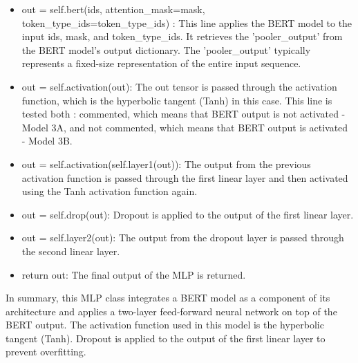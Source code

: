 \begin{itemize}
    \item out = self.bert(ids, attention\_mask=mask, token\_type\_ids=token\_type\_ids) : This line applies the BERT model to the input ids, mask, and token\_type\_ids. It retrieves the 'pooler\_output' from the BERT model's output dictionary. The 'pooler\_output' typically represents a fixed-size representation of the entire input sequence.

    \item out = self.activation(out): The out tensor is passed through the activation function, which is the hyperbolic tangent (Tanh) in this case. This line is tested both : commented, which means that BERT output is not activated - Model 3A, and not commented, which means that BERT output is activated - Model 3B.

    \item out = self.activation(self.layer1(out)): The output from the previous activation function is passed through the first linear layer and then activated using the Tanh activation function again.

    \item out = self.drop(out): Dropout is applied to the output of the first linear layer.

    \item out = self.layer2(out): The output from the dropout layer is passed through the second linear layer.

    \item return out: The final output of the MLP is returned.
\end{itemize}

In summary, this MLP class integrates a BERT model as a component of its architecture and applies a two-layer feed-forward neural network on top of the BERT output. The activation function used in this model is the hyperbolic tangent (Tanh). Dropout is applied to the output of the first linear layer to prevent overfitting.


